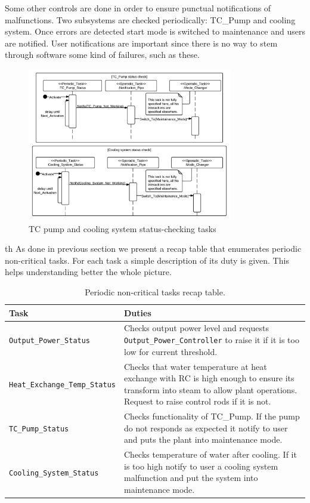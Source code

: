 \documentclass[10pt,a4paper]{report}
\begin{document}
Some other controls are done in order to ensure punctual notifications of 
malfunctions. Two subsystems are checked periodically: TC\_Pump and cooling 
system. Once errors are detected start mode is switched to maintenance 
and users are notified. User notifications are important since there is no way 
to stem through software some kind of failures, such as these.
\begin{figure}[htb]
\centering
\includegraphics[width=0.8\textwidth]{diagrams/TC_Status_Diagram2}
\caption{TC pump and cooling system status-checking tasks}
\end{figure}
th 
As done in previous section we present a recap table that enumerates periodic
non-critical tasks. For each task a simple description of its duty is given. This
helps understanding better the whole picture. 
\begin{table}[h!tb]
\centering 
\begin{tabular}{|l p{7cm}|}
\hline 
\textbf{Task} & \textbf{Duties} \\
\hline \hline
\texttt{Output\_Power\_Status} & Checks output power level and requests 
    \texttt{Output\_Power\_Controller} to raise it if it is too low for current 
    threshold.\\
\texttt{Heat\_Exchange\_Temp\_Status} & Checks that water temperature at heat 
    exchange with RC is high enough to ensure its transform into steam to allow
    plant operations. Request to raise control rods if it is not.\\
\texttt{TC\_Pump\_Status} & Checks functionality of TC\_Pump. If the pump do not
    responds as expected it notify to user and puts the plant into maintenance 
    mode.\\
\texttt{Cooling\_System\_Status} & Checks temperature of water after cooling. If
    it is too high notify to user a cooling system malfunction and put the 
    system into maintenance mode.\\
\hline
\end{tabular}
\caption{Periodic non-critical tasks recap table.}
\end{table}
\end{document}
